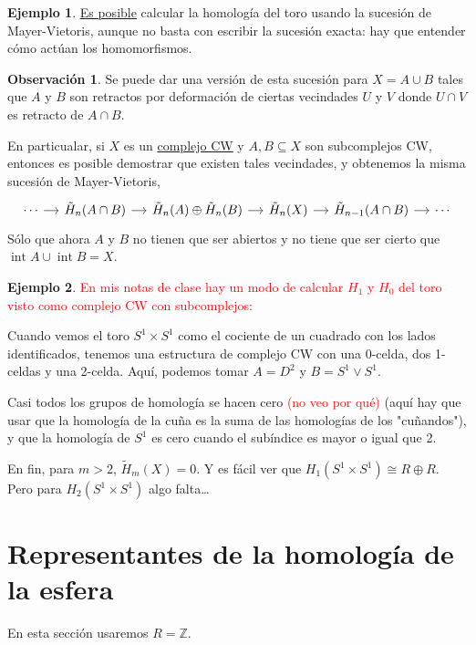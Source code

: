 \documentclass[spanish]{book}
\theoremstyle{definition}
\newtheorem*{obs}{Observación}
\newtheorem*{ejem}{Ejemplo}
\DeclareMathOperator{\Int}{int}
\begin{document}
	\begin{ejem}
		\href{https://math.stackexchange.com/questions/58311/the-homology-groups-of-t2-by-mayer-vietoris}{Es posible} calcular la homología del toro usando la sucesión de Mayer-Vietoris, aunque no basta con escribir la sucesión exacta: hay que entender cómo actúan los homomorfismos.
	\end{ejem}
	\begin{obs}
		Se puede dar una versión de esta sucesión para $X=A\cup B$ tales que $A$ y $B$ son retractos por deformación de ciertas vecindades $U$ y $V$ donde $U\cap V$ es retracto de $A\cap B$.
		
		En particualar, si $X$ es un \hyperref[chap:CCW]{complejo CW} y $A,B\subseteq X$ son subcomplejos CW, entonces es posible demostrar que existen tales vecindades, y obtenemos la misma sucesión de Mayer-Vietoris,
		\[\begin{tikzcd}[column sep= small]
			\cdots \arrow[r] & \tilde{H}_n(A\cap B) \arrow[r] & \tilde{H}_n(A) \oplus \tilde{H}_n(B) \arrow[r] & \tilde{H}_n(X) \arrow[r] & \tilde{H}_{n-1}(A\cap B) \arrow[r] &\cdots
		\end{tikzcd}\]
		Sólo que ahora $A$ y $B$ no tienen que ser abiertos y no tiene que ser cierto que $\Int A\cup\Int B=X$.
	\end{obs}
\begin{ejem}\label{ejem:toroCWMV}
	\textcolor{red}{En mis notas de clase hay un modo de calcular $H_1$ y $H_0$ del toro visto como complejo CW con subcomplejos:}
	
	Cuando vemos el toro $S^1\times S^1$ como el cociente de un cuadrado con los lados identificados, tenemos una estructura de complejo CW con una 0-celda, dos 1-celdas y una 2-celda. Aquí, podemos tomar $A=D^2$ y $B=S^1\vee S^1$.
	
	Casi todos los grupos de homología se hacen cero \textcolor{red}{(no veo por qué)} (aquí hay que usar que la homología de la cuña es la suma de las homologías de los "cuñandos"), y que la homología de $S^1$ es cero cuando el subíndice es mayor o igual que 2.
	
	En fin, para $m>2$, $\tilde H_m(X)=0$. Y es fácil ver que $H_1(S^1\times S^1)\cong R\oplus R$. Pero para $H_2(S^1\times S^1)$ algo falta…
	
\end{ejem}

\section{Representantes de la homología de la esfera}
	En esta sección usaremos $R=\mathbb Z$. 
	
\end{document}
